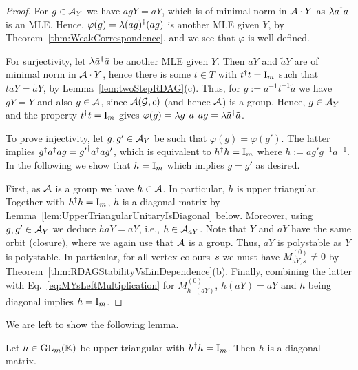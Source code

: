 \begin{proof}
	For $g \in \mathcal{A}_Y$ we have $a g Y = aY$, which is of minimal norm in $\mathcal{A} \cdot Y$ as $\lambda a^{\dagger} a$ is an MLE. Hence, $\varphi(g) = \lambda (ag)^{\dagger}(ag)$ is another MLE given $Y$, by Theorem~\ref{thm:WeakCorrespondence}, and we see that $\varphi$ is well-defined.
	
	For surjectivity, let $\lambda \tilde{a}^{\dagger} \tilde{a}$ be another MLE given $Y$. Then $aY$ and $\tilde{a}Y$ are of minimal norm in $\mathcal{A} \cdot Y$, hence there is some $t \in T$ with $t^{\dagger} t = \operatorname{I}_m$ such that $taY = \tilde{a} Y$, by Lemma~\ref{lem:twoStepRDAG}(c). Thus, for $g := a^{-1} t^{-1} \tilde{a} $ we have $gY = Y$ and also $g \in \mathcal{A}$, since $\mathcal{A}(\mathcal{G}, c)$ (and hence $\mathcal{A}$) is a group. Hence, $g \in \mathcal{A}_Y$ and the property $t^{\dagger} t = \operatorname{I}_m$ gives $\varphi(g) =  \lambda g^{\dagger}  a^{\dagger}  a g = \lambda \tilde{a}^{\dagger} \tilde{a}$.
	
	To prove injectivity, let $g, g' \in \mathcal{A}_Y$ be such that $\varphi(g) = \varphi(g')$. The latter implies $g^{\dagger} a^{\dagger} ag = {g'}^{\dagger} a^{\dagger} a g'$, which is equivalent to $h^{\dagger} h = \operatorname{I}_m$ where $h := a g' g^{-1} a^{-1}$.  In the following we show that $h = \operatorname{I}_m$ which implies $g = g'$ as desired.
	
	First, as $\mathcal{A}$ is a group we have $h \in \mathcal{A}$. In particular, $h$ is upper triangular. Together with $h^{\dagger} h = \operatorname{I}_m$, $h$ is a diagonal matrix by Lemma~\ref{lem:UpperTriangularUnitaryIsDiagonal} below.
	Moreover, using $g,g' \in \mathcal{A}_Y$ we deduce $haY = aY$, i.e., $h \in \mathcal{A}_{aY}$. Note that $Y$ and $aY$ have the same orbit (closure), where we again use that $\mathcal{A}$ is a group. Thus, $aY$ is polystable as $Y$ is polystable. In particular, for all vertex colours~$s$ we must have $M_{aY,s}^{(0)} \neq 0$ by Theorem~\ref{thm:RDAGStabilityVsLinDependence}(b). Finally, combining the latter with Eq.~\eqref{eq:MYsLeftMultiplication} for $M_{h \cdot (aY)}^{(0)}$, $h(aY) = aY$ and $h$ being diagonal implies $h = \operatorname{I}_m$.
\end{proof}

We are left to show the following lemma.

\begin{lemma}\label{lem:UpperTriangularUnitaryIsDiagonal}
	Let $h \in \operatorname{GL}_{m}(\mathbb K)$ be upper triangular with $h^{\dagger} h = \operatorname{I}_m$. Then $h$ is a diagonal matrix.
\end{lemma}

